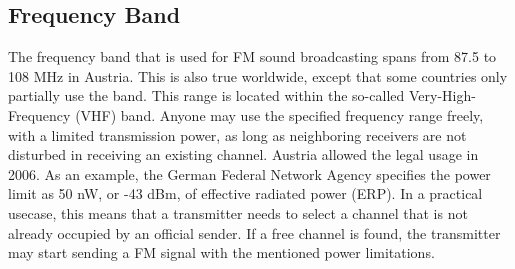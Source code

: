 \documentclass[conference]{IEEEtran}
\begin{document}
  \subsection{Frequency Band}
    The frequency band that is used for FM sound broadcasting spans from 87.5 to 108 MHz in Austria.
    This is also true worldwide, except that some countries only partially use the band. %
    This range is located within the so-called Very-High-Frequency (VHF) band.
    Anyone may use the specified frequency range freely, with a limited transmission power, as long as neighboring receivers are not disturbed in receiving an existing channel.
    Austria allowed the legal usage in 2006. %
    As an example, the German Federal Network Agency specifies the power limit as 50 nW, or -43 dBm, of effective radiated power (ERP). %
    In a practical usecase, this means that a transmitter needs to select a channel that is not already occupied by an official sender.
    If a free channel is found, the transmitter may start sending a FM signal with the mentioned power limitations.
\end{document}
